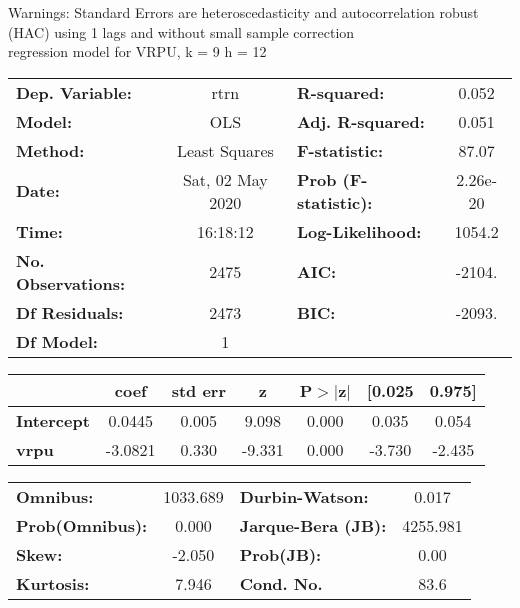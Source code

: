 Warnings: \newline
 [1] Standard Errors are heteroscedasticity and autocorrelation robust (HAC) using 1 lags and without small sample correction\\ 

regression model for VRPU, k = 9 h = 12\begin{center}
\begin{tabular}{lclc}
\toprule
\textbf{Dep. Variable:}    &       rtrn       & \textbf{  R-squared:         } &     0.052   \\
\textbf{Model:}            &       OLS        & \textbf{  Adj. R-squared:    } &     0.051   \\
\textbf{Method:}           &  Least Squares   & \textbf{  F-statistic:       } &     87.07   \\
\textbf{Date:}             & Sat, 02 May 2020 & \textbf{  Prob (F-statistic):} &  2.26e-20   \\
\textbf{Time:}             &     16:18:12     & \textbf{  Log-Likelihood:    } &    1054.2   \\
\textbf{No. Observations:} &        2475      & \textbf{  AIC:               } &    -2104.   \\
\textbf{Df Residuals:}     &        2473      & \textbf{  BIC:               } &    -2093.   \\
\textbf{Df Model:}         &           1      & \textbf{                     } &             \\
\bottomrule
\end{tabular}
\begin{tabular}{lcccccc}
                   & \textbf{coef} & \textbf{std err} & \textbf{z} & \textbf{P$> |$z$|$} & \textbf{[0.025} & \textbf{0.975]}  \\
\midrule
\textbf{Intercept} &       0.0445  &        0.005     &     9.098  &         0.000        &        0.035    &        0.054     \\
\textbf{vrpu}      &      -3.0821  &        0.330     &    -9.331  &         0.000        &       -3.730    &       -2.435     \\
\bottomrule
\end{tabular}
\begin{tabular}{lclc}
\textbf{Omnibus:}       & 1033.689 & \textbf{  Durbin-Watson:     } &    0.017  \\
\textbf{Prob(Omnibus):} &   0.000  & \textbf{  Jarque-Bera (JB):  } & 4255.981  \\
\textbf{Skew:}          &  -2.050  & \textbf{  Prob(JB):          } &     0.00  \\
\textbf{Kurtosis:}      &   7.946  & \textbf{  Cond. No.          } &     83.6  \\
\bottomrule
\end{tabular}
\end{center}

